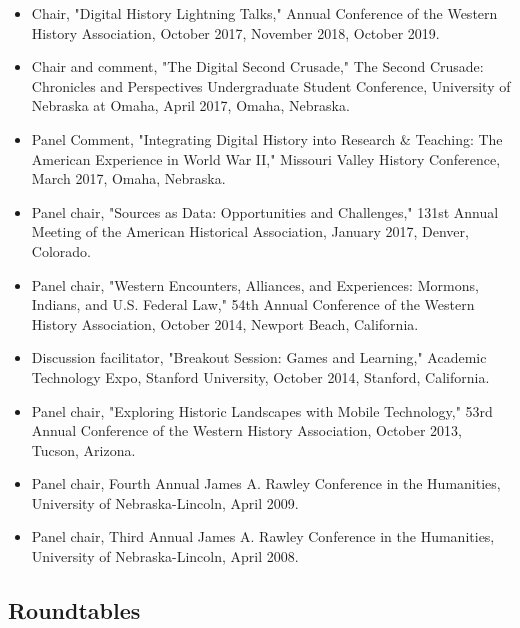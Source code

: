 \documentclass[10pt]{article}
\begin{document}
\begin{itemize}
  \item Chair, "Digital History Lightning Talks," Annual Conference of the Western History Association, October 2017, November 2018, October 2019.
  
  \item Chair and comment, "The Digital Second Crusade," The Second Crusade: Chronicles and Perspectives Undergraduate Student Conference, University of Nebraska at Omaha, April 2017, Omaha, Nebraska.
  
  \item Panel Comment, "Integrating Digital History into Research \& Teaching: The American Experience in World War II," Missouri Valley History Conference, March 2017, Omaha, Nebraska.
  
  \item Panel chair, "Sources as Data: Opportunities and Challenges," 131st Annual Meeting of the American Historical Association, January 2017, Denver, Colorado.
  
  \item Panel chair, "Western Encounters, Alliances, and Experiences: Mormons, Indians, and U.S. Federal Law," 54th Annual Conference of the Western History Association, October 2014, Newport Beach, California.
  
  \item Discussion facilitator, "Breakout Session: Games and Learning," Academic Technology Expo, Stanford University, October 2014, Stanford, California.
  
  \item Panel chair, "Exploring Historic Landscapes with Mobile Technology," 53rd Annual Conference of the Western History Association, October 2013, Tucson, Arizona.
  
  \item Panel chair, Fourth Annual James A. Rawley Conference in the Humanities, University of Nebraska-Lincoln, April 2009.
  
  \item Panel chair, Third Annual James A. Rawley Conference in the Humanities, University of Nebraska-Lincoln, April 2008.
\end{itemize}

\subsection*{Roundtables}
\end{document}
